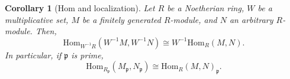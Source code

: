 \documentclass{amsart}[12pt]
\newcommand{\Hom}{\mathrm{Hom}}
\newcommand{\p}{{\mathfrak p}}
\numberwithin{equation}{section}
\theoremstyle{plain} %
\newtheorem{corollary}[equation]{Corollary}
\newtheorem{lemma}[equation]{Lemma}
\newtheorem{proposition}[equation]{Proposition}
\theoremstyle{definition}
\newtheorem{definition}[equation]{Definition}
\theoremstyle{remark}
\newcommand{\Spec}{\mathrm{Spec}}
\begin{document}
\begin{corollary}[Hom and localization]
	Let $R$ be a Noetherian ring, $W$ be a multiplicative set, $M$ be a finitely generated $R$-module, and $N$ an arbitrary $R$-module. Then,
	\[ \Hom_{W^{-1}R}(W^{-1}M , W^{-1}N) \cong W^{-1} \Hom_R(M,N). \]
	In particular, if $\p$ is prime,
	\[ \Hom_{R_{\p}}(M_{\p} , N_{\p}) \cong \Hom_R(M,N)_{\p}. \]
\end{corollary}




%
%
\end{document}
